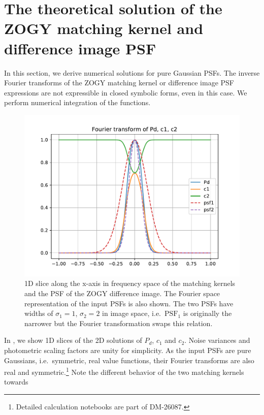 \documentclass[11pt]{article}
\begin{document}
\section{The theoretical solution of the ZOGY matching kernel and difference
image PSF\label{sec:ZOGYtheo}}
%
\par In this section, we derive numerical solutions for pure Gaussian
PSFs. The inverse Fourier transforms of the ZOGY matching
kernel or difference image PSF expressions are not expressible in closed
symbolic forms, even in this case. We perform numerical integration of the
functions.
%
\begin{figure}
\begin{center}
  \includegraphics[width=5.5in]{fig/zogy_theo_Gaussians_ft_Pd_c1_c2.pdf}
\end{center}
\caption{\label{fig:theo_Gaussians_ft}1D slice along the x-axis in frequency
  space of the matching kernels and the PSF of the ZOGY difference
  image. The Fourier space representation of the input PSFs is also
  shown. The two PSFs have widths of $\sigma_1 = 1$, $\sigma_2 = 2$ in image
  space, i.e.\ \(\mathrm{PSF}_1\) is originally the narrower but the Fourier
  transformation swaps this relation.}
\end{figure}
%
\par In , we show 1D slices of the 2D solutions
of \(P_d\), \(c_1\) and \(c_2\). Noise variances and photometric scaling
factors are unity for simplicity. As the input PSFs are pure Gaussians,
i.e.\ symmetric, real value functions, their Fourier transforms are also
real and symmetric.\footnote{Detailed calculation notebooks are part of
  DM-26087.} Note the different behavior of the two matching kernels towards
\end{document}
